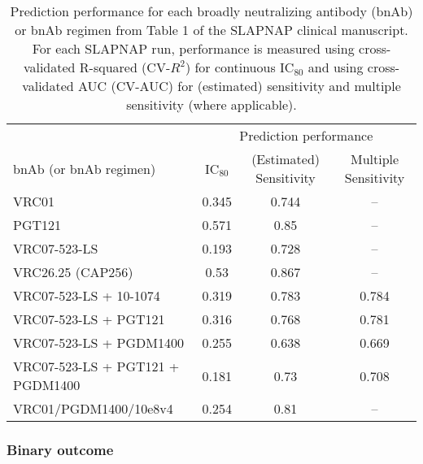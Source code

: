 \documentclass[10pt]{article}
\begin{document}
\begin{table}
    \centering
    \caption{Prediction performance for each broadly neutralizing antibody (bnAb) or bnAb regimen from Table 1 of the SLAPNAP clinical manuscript. For each SLAPNAP run, performance is measured using cross-validated R-squared (CV-$R^2$) for continuous IC$_{80}$ and using cross-validated AUC (CV-AUC) for (estimated) sensitivity and multiple sensitivity (where applicable).}
    \begin{tabular}{l|ccc}
        & \multicolumn{3}{c}{Prediction performance} \\
        bnAb (or bnAb regimen) & IC$_{80}$ & (Estimated) Sensitivity & Multiple Sensitivity \\
        \hline
        VRC01 & 0.345 & 0.744 & -- \\
        PGT121 & 0.571 & 0.85 & -- \\
        VRC07-523-LS & 0.193 & 0.728 & --\\
        VRC26.25 (CAP256) & 0.53 & 0.867 & --\\
        VRC07-523-LS + 10-1074 & 0.319 & 0.783 & 0.784 \\
        VRC07-523-LS + PGT121 & 0.316 & 0.768 & 0.781 \\
        VRC07-523-LS + PGDM1400 & 0.255 & 0.638 & 0.669 \\
        VRC07-523-LS + PGT121 + PGDM1400 & 0.181 & 0.73 & 0.708 \\
        VRC01/PGDM1400/10e8v4 & 0.254 & 0.81 & --
    \end{tabular}
    \label{tab:perf}
\end{table}

\subsubsection{Binary outcome}
\end{document}
